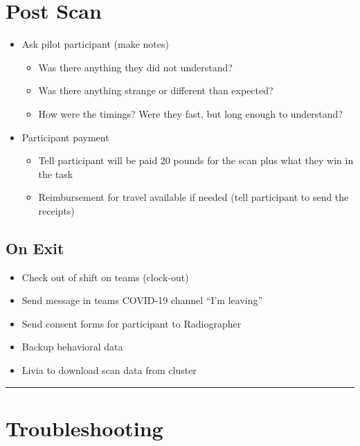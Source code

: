 \documentclass[
]{book}
\providecommand{\tightlist}{%
  \setlength{\itemsep}{0pt}\setlength{\parskip}{0pt}}
\begin{document}
\hypertarget{post-scan}{%
\section{Post Scan}\label{post-scan}}

\begin{itemize}
\tightlist
\item
  Ask pilot participant (make notes)

  \begin{itemize}
  \tightlist
  \item
    Was there anything they did not understand?
  \item
    Was there anything strange or different than expected?
  \item
    How were the timings? Were they fast, but long enough to understand?
  \end{itemize}
\item
  Participant payment

  \begin{itemize}
  \tightlist
  \item
    Tell participant will be paid 20 pounds for the scan plus what they win in the task
  \item
    Reimbursement for travel available if needed (tell participant to send the receipts)
  \end{itemize}
\end{itemize}

\hypertarget{on-exit}{%
\subsection{On Exit}\label{on-exit}}

\begin{itemize}
\tightlist
\item
  Check out of shift on teams (clock-out)
\item
  Send message in teams COVID-19 channel ``I'm leaving''
\item
  Send consent forms for participant to Radiographer
\item
  Backup behavioral data
\item
  Livia to download scan data from cluster
\end{itemize}

\begin{center}\rule{0.5\linewidth}{0.5pt}\end{center}

\hypertarget{troubleshooting}{%
\section{Troubleshooting}\label{troubleshooting}}
\end{document}
